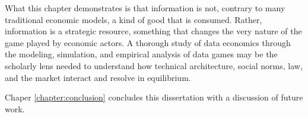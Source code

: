 \documentclass[../thesis.tex]{subfiles}
\begin{document}
 What this chapter demonstrates is that information
 is not, contrary to many traditional economic models,
 a kind of good that is consumed.
 Rather, information is a strategic resource, something
 that changes the very nature of the game played by
 economic actors.
 A thorough study of data economics through the
 modeling, simulation, and empirical analysis of
 data games may be the scholarly lens needed to
 understand how technical architecture, social norms,
 law, and the market interact and resolve in equilibrium.

 Chaper \ref{chapter:conclusion} concludes this dissertation
 with a discussion of future work.
 
\end{document}
